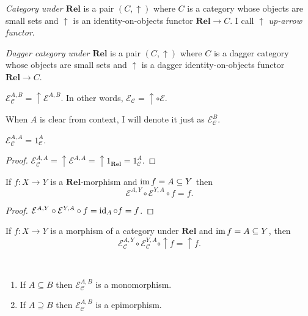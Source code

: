 \begin{defn}
\emph{Category under $\mathbf{Rel}$} is a pair $(C , \uparrow)$
where $C$ is a category whose objects are small sets and $\uparrow$ is an
identity-on-objects functor $\mathbf{Rel} \rightarrow C$. I call
$\uparrow$ \emph{up-arrow functor}.
\end{defn}

\begin{defn}
  \emph{Dagger category under $\mathbf{Rel}$} is a pair $(C ,
  \uparrow)$ where $C$ is a dagger category whose objects are small sets and
  $\uparrow$ is a dagger identity-on-objects functor $\mathbf{Rel}
  \rightarrow C$.
\end{defn}

\begin{defn}
  $\mathcal{E}_{\mathcal{C}}^{A,B} = \uparrow \mathcal{E}^{A,B}$. In
  other words, $\mathcal{E}_{\mathcal{C}} = \uparrow \circ \mathcal{E}$.
  
  When $A$ is clear from context, I will denote it just as $\mathcal{E}_{\mathcal{C}}^B$.
\end{defn}

\begin{prop}
  $\mathcal{E}_{\mathcal{C}}^{A,A} = 1_{\mathcal{C}}^A$.
\end{prop}

\begin{proof}
  $\mathcal{E}_{\mathcal{C}}^{A,A} = \uparrow \mathcal{E}^{A,A} =
  \uparrow 1_{\mathbf{Rel}} = 1_{\mathcal{C}}^A$.
\end{proof}

\begin{prop}
  If $f : X \rightarrow Y$ is a $\mathbf{Rel}$-morphism and
  $\operatorname{im} f = A \subseteq Y$ then
  \[ \mathcal{E}^{A,Y} \circ \mathcal{E}^{Y,A} \circ f = f. \]
\end{prop}

\begin{proof}
  $\mathcal{E}^{A,Y} \circ \mathcal{E}^{Y,A} \circ f = \operatorname{id}_A
  \circ f = f$.
\end{proof}

\begin{cor}
  If $f : X \rightarrow Y$ is a morphism of a category under
  $\mathbf{Rel}$ and $\operatorname{im} f = A \subseteq Y$, then
  \[ \mathcal{E}_{\mathcal{C}}^{A,Y} \circ \mathcal{E}_{\mathcal{C}}^{Y,A}
  \circ \uparrow f = \uparrow f. \]
\end{cor}

\begin{prop}
  ~  
  \begin{enumerate}
    \item If $A \subseteq B$ then $\mathcal{E}_{\mathcal{C}}^{A,B}$ is a
    monomorphism.
    
    \item If $A \supseteq B$ then $\mathcal{E}_{\mathcal{C}}^{A,B}$ is a
    epimorphism.
  \end{enumerate}
\end{prop}

